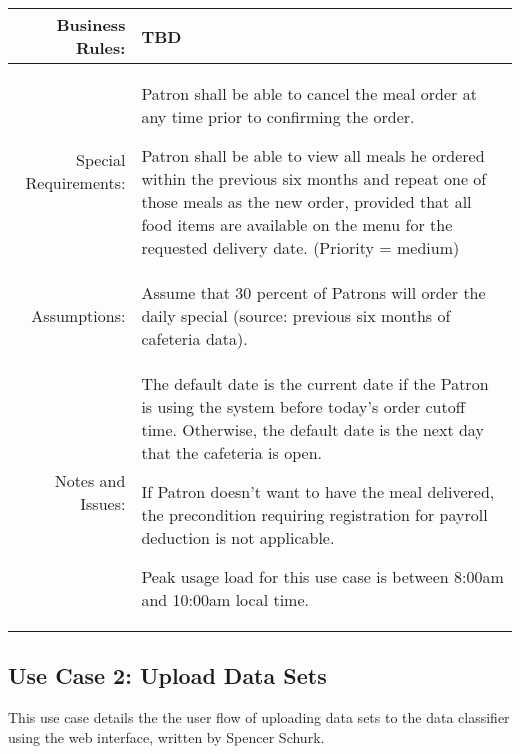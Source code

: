 \documentclass[12pt,oneside,letterpaper]{article}
\newenvironment{packed_enumerate}{ %
\vspace{-7mm}
\begin{enumerate}
  \setlength{\itemsep}{0pt}
  \setlength{\parskip}{0pt}
  \setlength{\parsep}{0pt}
}{\end{enumerate}
\vspace{-8mm}}
\begin{document}
\begin{longtable}{|r|p{3.8in}|}
\hline
Business Rules:&TBD\\
\hline
Special Requirements:&
\begin{packed_enumerate}
\item Patron shall be able to cancel the meal order at any time prior to confirming the order.
\item Patron shall be able to view all meals he ordered within the previous six months and repeat one of those meals as the new order, provided that all food items are available on the menu for the requested delivery date. (Priority = medium)
\end{packed_enumerate}\\
\hline
Assumptions:&Assume that 30 percent of Patrons will order the daily special (source: previous six months of cafeteria data).\\
\hline
Notes and Issues:&
\begin{packed_enumerate}
\item The default date is the current date if the Patron is using the system before today's order cutoff time. Otherwise, the default date is the next day that the cafeteria is open.
\item If Patron doesn't want to have the meal delivered, the precondition requiring registration for payroll deduction is not applicable.
\item Peak usage load for this use case is between 8:00am and 10:00am local time.
\end{packed_enumerate}\\
\hline
\end{longtable}


\subsection{\label{Upload Data Sets}Use Case 2: Upload Data Sets}
This use case details the the user flow of uploading data sets to the data classifier using the web interface, written by Spencer Schurk.
\end{document}
